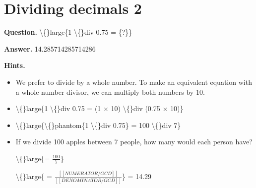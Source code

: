 \documentclass{article}
\begin{document}
\section*{Dividing decimals 2}
\textbf{Question.} \textbackslash\{\}large\{1 \textbackslash\{\}div 0.75 = \{?\}\}

\textbf{Answer.} 14.285714285714286

\textbf{Hints.}
\begin{itemize}
  \item We prefer to divide by a whole number.
                To make an equivalent equation with a whole number divisor, we can multiply both numbers by 10.
  \item \textbackslash\{\}large\{1 \textbackslash\{\}div 0.75 =
                (1 $\times$ 10) \textbackslash\{\}div (0.75 $\times$ 10)\}
  \item \textbackslash\{\}large\{\textbackslash\{\}phantom\{1 \textbackslash\{\}div 0.75\} =
                100 \textbackslash\{\}div 7\}
  \item If we divide 100 apples between
                    7 people, how many would each person have?
                
                \textbackslash\{\}large\{= $\frac{100}{7}$\}
                
                    \textbackslash\{\}large\{
                     = $\frac{[[NUMERATOR / GCD]]}{[[DENOMINATOR / GCD]]}$\}
                    = 14.29
\end{itemize}
\end{document}
